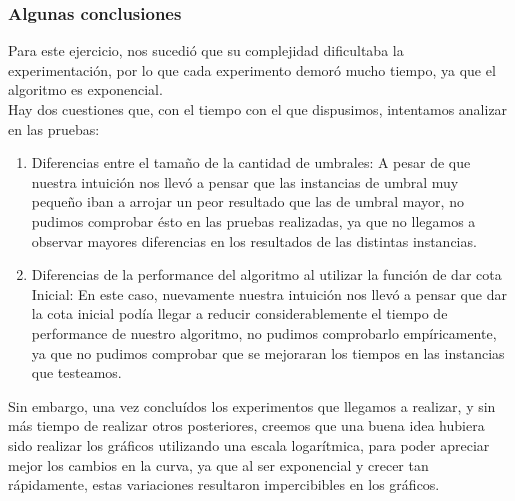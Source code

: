 \documentclass[10pt,a4paper]{article}
\begin{document}
\newpage \subsubsection{Algunas conclusiones}
Para este ejercicio, nos sucedió que su complejidad dificultaba la experimentación, por lo que cada experimento demoró mucho tiempo, ya que el algoritmo es exponencial.\\
Hay dos cuestiones que, con el tiempo con el que dispusimos, intentamos analizar en las pruebas:
\begin{enumerate}
\item Diferencias entre el tamaño de la cantidad de umbrales: A pesar de que nuestra intuición nos llevó a pensar que las instancias de umbral muy pequeño iban a arrojar un peor resultado que las de umbral mayor, no pudimos comprobar ésto en las pruebas realizadas, ya que no llegamos a observar mayores diferencias en los resultados de las distintas instancias.\\
\item Diferencias de la performance del algoritmo al utilizar la función de dar cota Inicial: En este caso, nuevamente nuestra intuición nos llevó a pensar que dar la cota inicial podía llegar a reducir considerablemente el tiempo de performance de nuestro algoritmo, no pudimos comprobarlo empíricamente, ya que no pudimos comprobar que se mejoraran los tiempos en las instancias que testeamos.\\
\end{enumerate}
Sin embargo, una vez concluídos los experimentos que llegamos a realizar, y sin más tiempo de realizar otros posteriores, creemos que una buena idea hubiera sido realizar los gráficos utilizando una escala logarítmica, para poder apreciar mejor los cambios en la curva, ya que al ser exponencial y crecer tan rápidamente, estas variaciones resultaron impercibibles en los gráficos.
\end{document}
